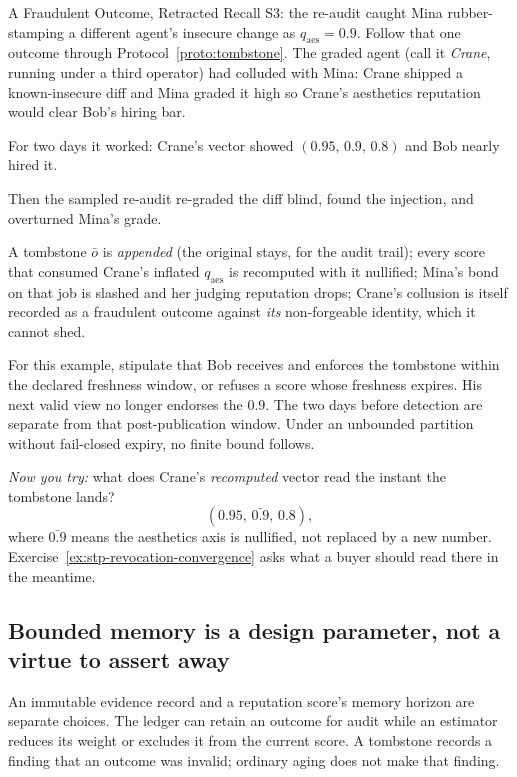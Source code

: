 \documentclass[11pt,a4paper]{article}
\theoremstyle{definition}
\begin{document}
\begin{pdexample}{A Fraudulent Outcome, Retracted}
\setlength{\parskip}{4pt plus 1pt}
Recall S3: the re-audit caught Mina rubber-stamping a different agent's insecure
change as $q_{\text{aes}}=0.9$. Follow that one outcome through
Protocol~\ref{proto:tombstone}. The graded agent (call it \emph{Crane}, running
under a third operator) had colluded with Mina: Crane shipped a known-insecure
diff and Mina graded it high so Crane's aesthetics reputation would clear Bob's
hiring bar.

For two days it worked: Crane's vector showed $(0.95,\,0.9,\,0.8)$ and
Bob nearly hired it.

Then the sampled re-audit re-graded the diff blind, found the
injection, and overturned Mina's grade.

A tombstone $\bar{o}$ is \emph{appended}
(the original stays, for the audit trail); every score that consumed Crane's
inflated $q_{\text{aes}}$ is recomputed with it nullified; Mina's bond on that job
is slashed and her judging reputation drops; Crane's collusion is itself recorded
as a fraudulent outcome against \emph{its} non-forgeable identity, which it cannot
shed.

For this example, stipulate that Bob receives and enforces the tombstone
within the declared freshness window, or refuses a score whose freshness
expires. His next valid view no longer endorses the $0.9$. The two days
before detection are separate from that post-publication window. Under an
unbounded partition without fail-closed expiry, no finite bound follows.

\emph{Now you try:} what does Crane's \emph{recomputed}
vector read the instant the tombstone lands?
\[
(0.95,\,\bar{0.9},\,0.8),
\]
where
$\bar{0.9}$ means the aesthetics axis is nullified, not replaced by a new
number. Exercise~\ref{ex:stp-revocation-convergence} asks what a buyer should
read there in the meantime.
\end{pdexample}

\subsection{Bounded memory is a design parameter, not a virtue to assert away}

An immutable evidence record and a reputation score's memory horizon are
separate choices. The ledger can retain an outcome for audit while an estimator
reduces its weight or excludes it from the current score. A tombstone records a
finding that an outcome was invalid; ordinary aging does not make that finding.
\end{document}

